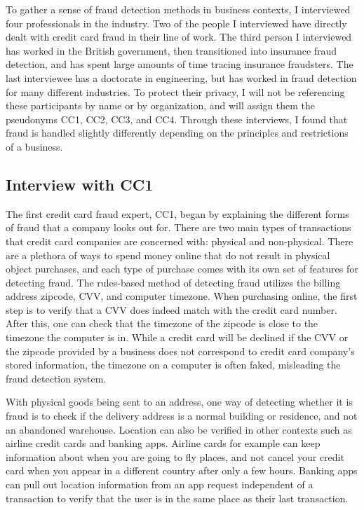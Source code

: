 \documentclass[midd]{thesis}
\begin{document}
To gather a sense of fraud detection methods in business contexts, I interviewed four professionals in the industry. Two of the people I interviewed have directly dealt with credit card fraud in their line of work. The third person I interviewed has worked in the British government, then transitioned into insurance fraud detection, and has spent large amounts of time tracing insurance fraudsters. The last interviewee has a doctorate in engineering, but has worked in fraud detection for many different industries. To protect their privacy, I will not be referencing these participants by name or by organization, and will assign them the pseudonyms CC1, CC2, CC3, and CC4. Through these interviews, I found that fraud is handled slightly differently depending on the principles and restrictions of a business.

\subsection{Interview with CC1}

The first credit card fraud expert, CC1, began by explaining the different forms of fraud that a company looks out for. There are two main types of transactions that credit card companies are concerned with: physical and non-physical. There are a plethora of ways to spend money online that do not result in physical object purchases, and each type of purchase comes with its own set of features for detecting fraud. The rules-based method of detecting fraud utilizes the billing address zipcode, CVV, and computer timezone. When purchasing online, the first step is to verify that a CVV does indeed match with the credit card number. After this, one can check that the timezone of the zipcode is close to the timezone the computer is in. While a credit card will be declined if the CVV or the zipcode provided by a business does not correspond to credit card company's stored information, the timezone on a computer is often faked, misleading the fraud detection system. 

With physical goods being sent to an address, one way of detecting whether it is fraud is to check if the delivery address is a normal building or residence, and not an abandoned warehouse. Location can also be verified in other contexts such as airline credit cards and banking apps. Airline cards for example can keep information about when you are going to fly places, and not cancel your credit card when you appear in a different country after only a few hours. Banking apps can pull out location information from an app request independent of a transaction to verify that the user is in the same place as their last transaction.
\end{document}
